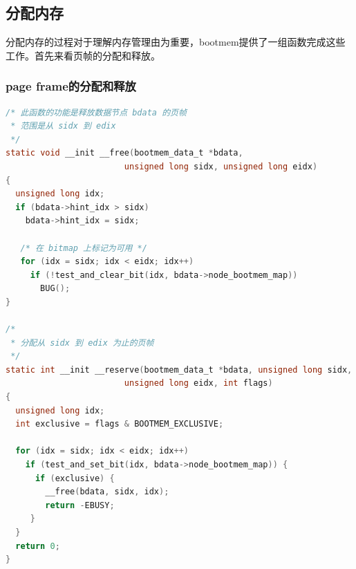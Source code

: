 \documentclass[b5paper,9pt,twoside,openany]{article}
\begin{document}
\subsection{分配内存}
分配内存的过程对于理解内存管理由为重要，bootmem提供了一组函数完成这些工作。首先来看页帧的分配和释放。
\subsubsection{page frame的分配和释放}
\begin{lstlisting}[language=C]
/* 此函数的功能是释放数据节点 bdata 的页帧
 * 范围是从 sidx 到 edix
 */
static void __init __free(bootmem_data_t *bdata,
                        unsigned long sidx, unsigned long eidx)
{
  unsigned long idx;
  if (bdata->hint_idx > sidx)
    bdata->hint_idx = sidx;

   /* 在 bitmap 上标记为可用 */
   for (idx = sidx; idx < eidx; idx++)
     if (!test_and_clear_bit(idx, bdata->node_bootmem_map))
       BUG();
}

/*
 * 分配从 sidx 到 edix 为止的页帧
 */
static int __init __reserve(bootmem_data_t *bdata, unsigned long sidx,
                        unsigned long eidx, int flags)
{
  unsigned long idx;
  int exclusive = flags & BOOTMEM_EXCLUSIVE;

  for (idx = sidx; idx < eidx; idx++)
    if (test_and_set_bit(idx, bdata->node_bootmem_map)) {
      if (exclusive) {
        __free(bdata, sidx, idx);
        return -EBUSY;
     }
  }
  return 0;
}

\end{lstlisting}
\end{document}
